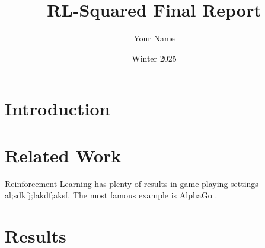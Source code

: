 \documentclass[12pt, twocolumn]{article}
\title{RL-Squared Final Report}
\author{Your Name}
\date{Winter 2025}
\begin{document}
\maketitle

\begin{abstract}

\end{abstract}

\section{Introduction}


\section{Related Work}
Reinforcement Learning has plenty of results in game playing settings al;sdkfj;lakdf;aksf. The most famous example is AlphaGo \cite{silver2016mastering}.

\cite{zhang2019hierarchical}

\section{Results}


\newpage


\end{document}
